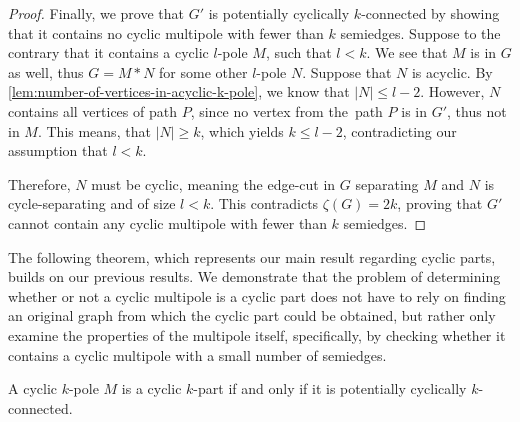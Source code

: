 \documentclass[12pt, twoside]{book}
\begin{document}
\begin{proof}
	Finally, we prove that $G'$ is potentially cyclically $k$-connected by showing that it contains no cyclic multipole with fewer than $k$ semiedges. Suppose to the contrary that it contains a cyclic $l$-pole $M$, such that $l<k$. We see that $M$ is in $G$ as well, thus $G=M*N$ for some other $l$-pole $N$. Suppose that $N$ is acyclic. By \cref{lem:number-of-vertices-in-acyclic-k-pole}, we know that $|N|\leq l-2$. However, $N$ contains all vertices of path $P$, since no vertex from the~path $P$ is in $G'$, thus not in $M$. This means, that $|N|\geq k$, which yields $k\leq l-2$, contradicting our assumption that $l<k$.
	
	Therefore, $N$ must be cyclic, meaning the edge-cut in $G$ separating $M$ and $N$ is cycle-separating and of size $l<k$. This contradicts $\zeta(G)=2k$, proving that $G'$ cannot contain any cyclic multipole with fewer than $k$ semiedges.
\end{proof}

The following theorem, which represents our main result regarding cyclic parts, builds on our previous results. We demonstrate that the problem of determining whether or not a cyclic multipole is a cyclic part does not have to rely on finding an original graph from which the cyclic part could be obtained, but rather only examine the properties of the multipole itself, specifically, by checking whether it contains a cyclic multipole with a small number of semiedges.

\begin{theorem}\label{th:alternative-definition-of-cyclic-part}
	A cyclic $k$-pole $M$ is a cyclic $k$-part if and only if it is potentially cyclically $k$-connected.
\end{theorem}
\end{document}
